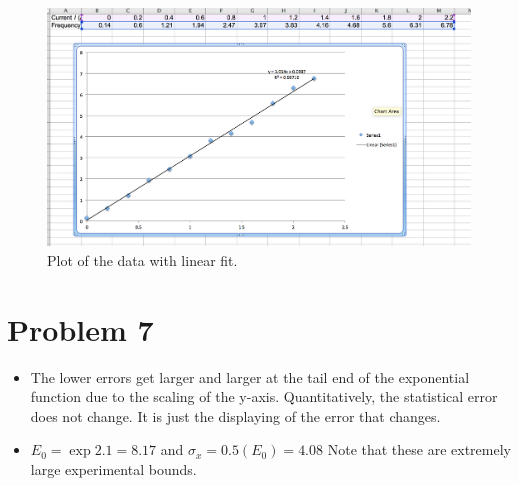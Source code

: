 \documentclass[12pt]{article}
\begin{document}
\begin{figure}[h!]
  \caption{Plot of the data with linear fit.}
  \centering
    \includegraphics[width=15 cm]{linear_reg.png}
\end{figure}
\section{Problem 7}
\begin{itemize}
	\item The lower errors get larger and larger at the tail end of the exponential function due to the scaling of the y-axis. Quantitatively, the statistical error does not change. It is just the displaying of the error that changes. 
	\item $E_0 = \exp{2.1}=8.17$ and $\sigma_x = 0.5(E_0) = 4.08$ Note that these are extremely large experimental bounds. 
\end{itemize}
\end{document}
